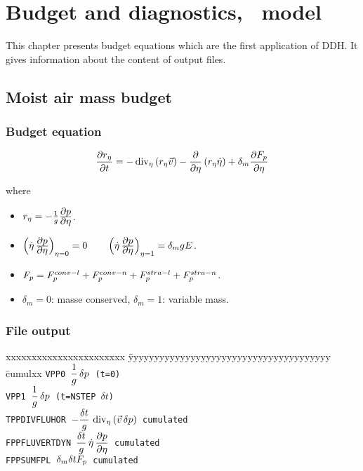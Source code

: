 \chapter{Budget and diagnostics, \arp\ model}
\null
\vspace{1cm}
This chapter presents budget equations which are the first application of DDH. It gives information about the content of output files.

\section{Moist air mass budget}
\subsection*{Budget equation}
$$
\frac{\displaystyle \partial r_{\eta}}{\displaystyle \partial t}=
- \mathop{\rm div}\nolimits_{\eta}\left(r_{\eta}\vec{v}\right)
- \frac{\displaystyle \partial }{\displaystyle \partial \eta}\left(r_{\eta}\dot{\eta}\right)
+ \delta_m \frac{\displaystyle \partial F_{p}}{\displaystyle \partial \eta}
$$

\noi where
\begin{itemize}
        \item $r_{\eta}=-\frac{1}{g}\frac{\displaystyle \partial p}{\displaystyle \partial \eta}$.
        \item $ \left( \dot \eta \,\frac{\displaystyle \partial p}{\displaystyle \partial \eta} \right)_{\eta=0} = 0 \qquad \left( \dot \eta \,\frac{\displaystyle \partial p}{\displaystyle \partial \eta} \right)_{\eta=1} = 
              \delta_m gE $.
        \item $F_{p} = F_{p}^{conv-l}+F_{p}^{conv-n}+F_{p}^{stra-l}+F_{p}^{stra-n}$.
  \item $\delta_m =0$: masse conserved, $\delta_m=1$: variable mass.
\end{itemize}

\subsection*{File output}

\begin{tabbing}
xxxxxxxxxxxxxxxxxxxxxxx \= yyyyyyyyyyyyyyyyyyyyyyyyyyyyyyyyyyyyyyy \= cumulxx \kill
\tt VPP0 \> $\displaystyle \frac 1g \,\delta p$ (t=0) \\[1ex]
\tt VPP1 \> $\displaystyle \frac 1g \,\delta p$ (t=NSTEP $\delta t$) \\[1ex]
\tt TPPDIVFLUHOR \> $\displaystyle -\frac{\delta t}g \,\mathop{\rm div}\nolimits_{\eta} \left( \vec v\,\delta p \right)$ \> cumulated\\[1ex]
\tt FPPFLUVERTDYN \> $\displaystyle \frac{\delta t}g \,\dot\eta\,\frac{\displaystyle \partial p}{\displaystyle \partial \eta}$ \> cumulated\\[1ex]
\tt FPPSUMFPL \> $\displaystyle \delta_m \delta t F_{p}$ \> cumulated
\end{tabbing}

